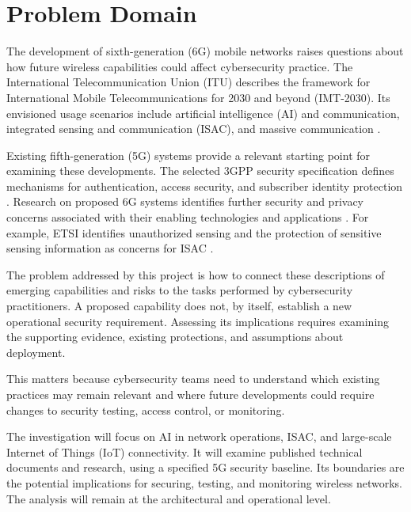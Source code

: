 \chapter{Problem Domain}
\label{ch:problem-domain}

The development of sixth-generation (6G) mobile networks
raises questions about how future wireless capabilities
could affect cybersecurity practice. The International
Telecommunication Union (ITU) describes the framework
for International Mobile Telecommunications for 2030
and beyond (IMT-2030). Its envisioned usage scenarios
include artificial intelligence (AI) and communication,
integrated sensing and communication (ISAC), and massive
communication \citep{itu2023imt2030}.

Existing fifth-generation (5G) systems provide a relevant
starting point for examining these developments.
The selected 3GPP security specification defines
mechanisms for authentication, access security, and
subscriber identity protection
\citep{threegpp2022security5g}. Research on proposed 6G
systems identifies further security and privacy concerns
associated with their enabling technologies and
applications \citep{porambage2021roadmap}. For example,
ETSI identifies unauthorized sensing and the protection
of sensitive sensing information as concerns for ISAC
\citep{etsi2026isacsecurity}.

The problem addressed by this project is how to connect
these descriptions of emerging capabilities and risks
to the tasks performed by cybersecurity practitioners.
A proposed capability does not, by itself, establish
a new operational security requirement. Assessing its
implications requires examining the supporting evidence,
existing protections, and assumptions about deployment.

This matters because cybersecurity teams need to
understand which existing practices may remain relevant
and where future developments could require changes
to security testing, access control, or monitoring.

The investigation will focus on AI in network operations,
ISAC, and large-scale Internet of Things (IoT)
connectivity. It will examine published technical
documents and research, using a specified 5G security
baseline. Its boundaries are the potential implications
for securing, testing, and monitoring wireless networks.
The analysis will remain at the architectural and
operational level.